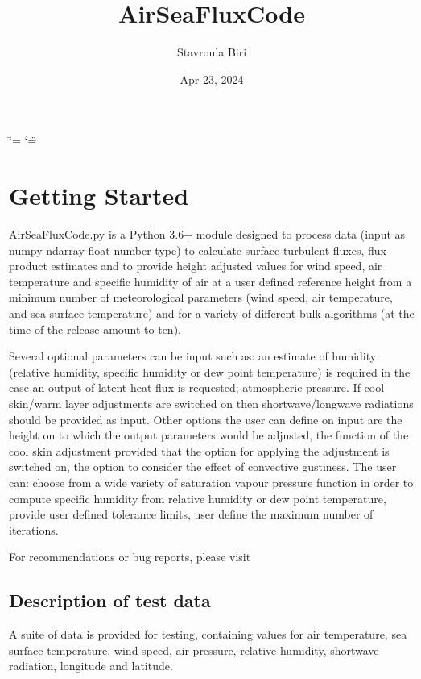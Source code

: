 \documentclass[letterpaper,10pt,english]{sphinxmanual}
\title{AirSeaFluxCode}
\date{Apr 23, 2024}
\author{Stavroula Biri}
\begin{document}
\ifdefined\shorthandoff
  \ifnum\catcode`\=\string=\active\shorthandoff{=}\fi
  \ifnum\catcode`\"=\active{}\fi
\fi

\pagestyle{empty}
\sphinxmaketitle
\pagestyle{plain}
\sphinxtableofcontents
\pagestyle{normal}
\label{\detokenize{index::doc}}


\sphinxstepscope


\chapter{Getting Started}
\label{\detokenize{getting_started:getting-started}}\label{\detokenize{getting_started::doc}}
\sphinxAtStartPar
AirSeaFluxCode.py is a Python 3.6+ module designed to process data (input as numpy ndarray float number type) to calculate surface turbulent fluxes, flux product estimates and to provide height adjusted values for wind speed, air temperature and specific humidity of air at a user defined reference height from a minimum number of meteorological parameters (wind speed, air temperature, and sea surface temperature) and for a variety of different bulk algorithms (at the time of the release amount to ten).

\sphinxAtStartPar
Several optional parameters can be input such as: an estimate of humidity (relative humidity, specific humidity or dew point temperature) is required in the case an output of latent heat flux is requested; atmospheric pressure. If cool skin/warm layer adjustments are switched on then shortwave/longwave radiations should be provided as input. Other options the user can define on input are the height on to which the output parameters would be adjusted, the function of the cool skin adjustment provided that the option for applying the adjustment is switched on, the option to consider the effect of convective gustiness. The user can: choose from a wide variety of saturation vapour pressure function in order to compute specific humidity from relative humidity or dew point temperature, provide user defined tolerance limits, user define the maximum number of iterations.

\sphinxAtStartPar
For recommendations or bug reports, please visit 


\section{Description of test data}
\label{\detokenize{getting_started:description-of-test-data}}
\sphinxAtStartPar
A suite of data is provided for testing, containing values for air temperature, sea surface temperature, wind speed, air pressure, relative humidity, shortwave radiation, longitude and latitude.
\end{document}
